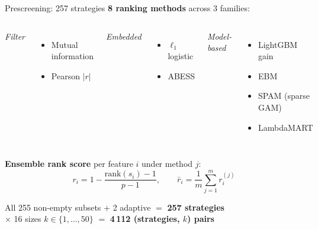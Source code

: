 \documentclass[aspectratio=169]{beamer}
\begin{document}
\begin{frame}{Prescreening: 257 strategies}
    \textbf{8 ranking methods} across 3 families:
    \begin{columns}[T,onlytextwidth]
        \small\textit{Filter}
        \begin{itemize}\footnotesize
            \item Mutual information
            \item Pearson $|r|$
        \end{itemize}
        \small\textit{Embedded}
        \begin{itemize}\footnotesize
            \item $\ell_1$ logistic
            \item ABESS
        \end{itemize}
        \small\textit{Model-based}
        \begin{itemize}\footnotesize
            \item LightGBM gain
            \item EBM
            \item SPAM (sparse GAM)
            \item LambdaMART
        \end{itemize}
    \end{columns}

    \vspace{0.6em}
    \textbf{Ensemble rank score} per feature $i$ under method $j$:
    \[
        r_i = 1 - \frac{\text{rank}(s_i)-1}{p-1}, \qquad
        \bar{r}_i = \frac{1}{m}\sum_{j=1}^{m} r_i^{(j)}
    \]

    \vspace{0.3em}
    All 255 non-empty subsets $+$ 2 adaptive $=$ \textbf{257 strategies}\\
    $\times$ 16 sizes $k \in \{1,\ldots,50\}$ $=$ \textbf{4\,112 (strategies, $k$) pairs}
\end{frame}
\end{document}
